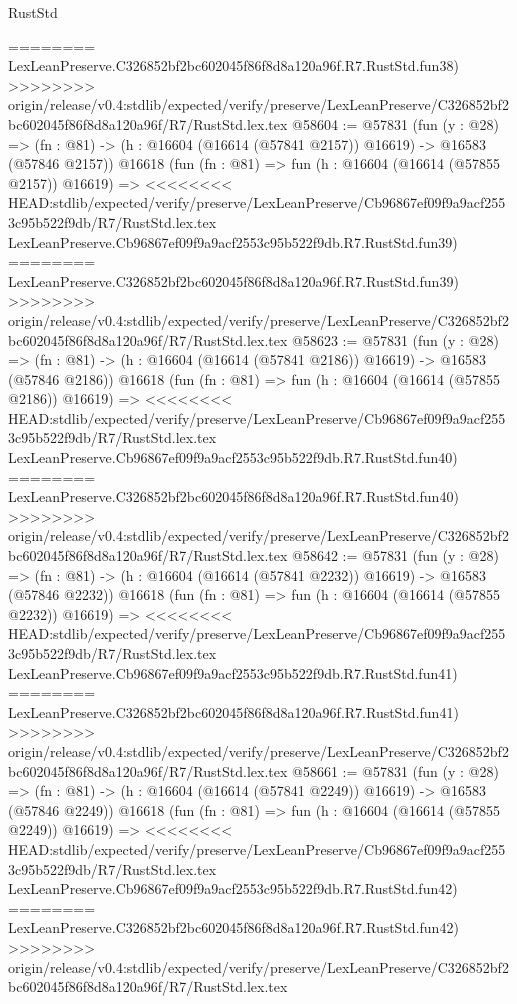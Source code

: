 \begin{lexlean}{RustStd}
\begin{coremodule}
{\begin{coremodule}
{{{{{{{{{{{{{{{{{{{{{{{{{{{{{{{{{{{{{{{{{{{{{{{{{{{{{{{========
    LexLeanPreserve.C326852bf2bc602045f86f8d8a120a96f.R7.RustStd.fun38)
>>>>>>>> origin/release/v0.4:stdlib/expected/verify/preserve/LexLeanPreserve/C326852bf2bc602045f86f8d8a120a96f/R7/RustStd.lex.tex
@58604 := @57831
    (fun (y : @28) =>
    (fn : @81) -> (h : @16604 (@16614 (@57841 @2157)) @16619) -> @16583 (@57846 @2157))
    @16618
    (fun (fn : @81) =>
    fun (h : @16604 (@16614 (@57855 @2157)) @16619) =>
<<<<<<<< HEAD:stdlib/expected/verify/preserve/LexLeanPreserve/Cb96867ef09f9a9acf2553c95b522f9db/R7/RustStd.lex.tex
    LexLeanPreserve.Cb96867ef09f9a9acf2553c95b522f9db.R7.RustStd.fun39)
========
    LexLeanPreserve.C326852bf2bc602045f86f8d8a120a96f.R7.RustStd.fun39)
>>>>>>>> origin/release/v0.4:stdlib/expected/verify/preserve/LexLeanPreserve/C326852bf2bc602045f86f8d8a120a96f/R7/RustStd.lex.tex
@58623 := @57831
    (fun (y : @28) =>
    (fn : @81) -> (h : @16604 (@16614 (@57841 @2186)) @16619) -> @16583 (@57846 @2186))
    @16618
    (fun (fn : @81) =>
    fun (h : @16604 (@16614 (@57855 @2186)) @16619) =>
<<<<<<<< HEAD:stdlib/expected/verify/preserve/LexLeanPreserve/Cb96867ef09f9a9acf2553c95b522f9db/R7/RustStd.lex.tex
    LexLeanPreserve.Cb96867ef09f9a9acf2553c95b522f9db.R7.RustStd.fun40)
========
    LexLeanPreserve.C326852bf2bc602045f86f8d8a120a96f.R7.RustStd.fun40)
>>>>>>>> origin/release/v0.4:stdlib/expected/verify/preserve/LexLeanPreserve/C326852bf2bc602045f86f8d8a120a96f/R7/RustStd.lex.tex
@58642 := @57831
    (fun (y : @28) =>
    (fn : @81) -> (h : @16604 (@16614 (@57841 @2232)) @16619) -> @16583 (@57846 @2232))
    @16618
    (fun (fn : @81) =>
    fun (h : @16604 (@16614 (@57855 @2232)) @16619) =>
<<<<<<<< HEAD:stdlib/expected/verify/preserve/LexLeanPreserve/Cb96867ef09f9a9acf2553c95b522f9db/R7/RustStd.lex.tex
    LexLeanPreserve.Cb96867ef09f9a9acf2553c95b522f9db.R7.RustStd.fun41)
========
    LexLeanPreserve.C326852bf2bc602045f86f8d8a120a96f.R7.RustStd.fun41)
>>>>>>>> origin/release/v0.4:stdlib/expected/verify/preserve/LexLeanPreserve/C326852bf2bc602045f86f8d8a120a96f/R7/RustStd.lex.tex
@58661 := @57831
    (fun (y : @28) =>
    (fn : @81) -> (h : @16604 (@16614 (@57841 @2249)) @16619) -> @16583 (@57846 @2249))
    @16618
    (fun (fn : @81) =>
    fun (h : @16604 (@16614 (@57855 @2249)) @16619) =>
<<<<<<<< HEAD:stdlib/expected/verify/preserve/LexLeanPreserve/Cb96867ef09f9a9acf2553c95b522f9db/R7/RustStd.lex.tex
    LexLeanPreserve.Cb96867ef09f9a9acf2553c95b522f9db.R7.RustStd.fun42)
========
    LexLeanPreserve.C326852bf2bc602045f86f8d8a120a96f.R7.RustStd.fun42)
>>>>>>>> origin/release/v0.4:stdlib/expected/verify/preserve/LexLeanPreserve/C326852bf2bc602045f86f8d8a120a96f/R7/RustStd.lex.tex
}}}}}}}}}}}}}}}}}}}}}}}}}}}}}}}}}}}}}}}}}}}}}}}}}}}}}}}
\end{coremodule}}
\end{coremodule}
\end{lexlean}

